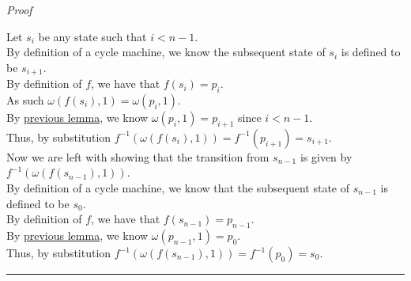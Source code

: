 \documentclass[a4paper,12pt]{article}
\begin{document}
\noindent
\textit{Proof}

\noindent Let $s_i$ be any state such that $i < n - 1$.\\

\noindent By definition of a cycle machine, we know the subsequent state of $s_i$ is defined to be $s_{i+1}$.\\

\noindent By definition of $f$, we have that $f(s_i) = p_i$.\\

\noindent As such $\omega(f(s_i), 1) = \omega(p_i, 1)$.\\

\noindent By \hyperlink{lemma:walk_1}{previous lemma}, we know $\omega(p_i, 1) = p_{i+1}$ since $i < n - 1$.\\

\noindent Thus, by substitution $f^{-1}(\omega(f(s_i), 1)) = f^{-1}(p_{i+1}) = s_{i+1}$.\\

\noindent Now we are left with showing that the transition from $s_{n-1}$ is given by $f^{-1}(\omega(f(s_{n-1}), 1))$.\\

\noindent By definition of a cycle machine, we know that the subsequent state of $s_{n-1}$ is defined to be $s_0$.\\

\noindent By definition of $f$, we have that $f(s_{n-1}) = p_{n-1}$.\\

\noindent By \hyperlink{lemma:walk_1}{previous lemma}, we know $\omega(p_{n-1}, 1) = p_0$.\\

\noindent Thus, by substitution $f^{-1}(\omega(f(s_{n-1}), 1)) = f^{-1}(p_0) = s_0$.\\

\begin{center}
\noindent\rule{8cm}{0.4pt}
\end{center}
\end{document}
